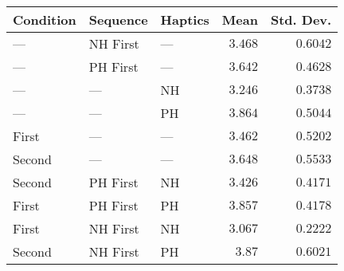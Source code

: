 \begin{tabular}{lllrr}
\toprule
Condition &  Sequence & Haptics &    Mean &  Std. Dev. \\
\midrule
      --- &  NH First &     --- & $3.468$ &   $0.6042$ \\
      --- &  PH First &     --- & $3.642$ &   $0.4628$ \\
      --- &       --- &      NH & $3.246$ &   $0.3738$ \\
      --- &       --- &      PH & $3.864$ &   $0.5044$ \\
    First &       --- &     --- & $3.462$ &   $0.5202$ \\
   Second &       --- &     --- & $3.648$ &   $0.5533$ \\
   Second &  PH First &      NH & $3.426$ &   $0.4171$ \\
    First &  PH First &      PH & $3.857$ &   $0.4178$ \\
    First &  NH First &      NH & $3.067$ &   $0.2222$ \\
   Second &  NH First &      PH &  $3.87$ &   $0.6021$ \\
\bottomrule
\end{tabular}

